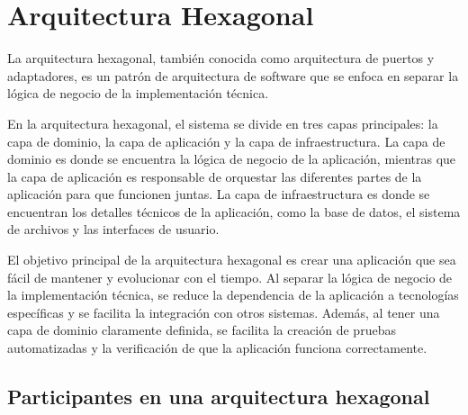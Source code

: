 \documentclass[executivepaper]{article}
\begin{document}
\section{Arquitectura Hexagonal}

La arquitectura hexagonal, también conocida como arquitectura de puertos y adaptadores, es un patrón de arquitectura de software que se enfoca en separar la lógica de negocio de la implementación técnica.

En la arquitectura hexagonal, el sistema se divide en tres capas principales: la capa de dominio, la capa de aplicación y la capa de infraestructura. La capa de dominio es donde se encuentra la lógica de negocio de la aplicación, mientras que la capa de aplicación es responsable de orquestar las diferentes partes de la aplicación para que funcionen juntas. La capa de infraestructura es donde se encuentran los detalles técnicos de la aplicación, como la base de datos, el sistema de archivos y las interfaces de usuario.

El objetivo principal de la arquitectura hexagonal es crear una aplicación que sea fácil de mantener y evolucionar con el tiempo. Al separar la lógica de negocio de la implementación técnica, se reduce la dependencia de la aplicación a tecnologías específicas y se facilita la integración con otros sistemas. Además, al tener una capa de dominio claramente definida, se facilita la creación de pruebas automatizadas y la verificación de que la aplicación funciona correctamente.

\subsection{Participantes en una arquitectura hexagonal}
\end{document}

